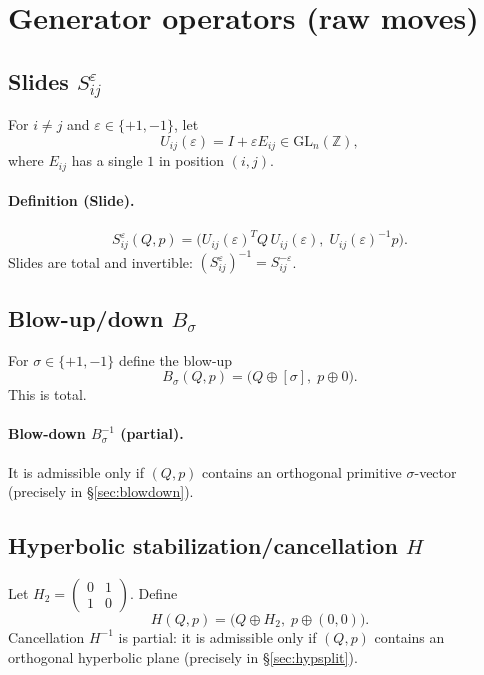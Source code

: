 \documentclass[11pt]{article}
\newcommand{\ZZ}{\mathbb{Z}}
\newcommand{\GL}{\mathrm{GL}}
\begin{document}
\section{Generator operators (raw moves)}

\subsection{Slides \texorpdfstring{$S_{ij}^{\varepsilon}$}{Sij}}
For $i\neq j$ and $\varepsilon\in\{+1,-1\}$, let
\[
U_{ij}(\varepsilon)=I+\varepsilon E_{ij}\in \GL_n(\ZZ),
\]
where $E_{ij}$ has a single $1$ in position $(i,j)$.

\paragraph{Definition (Slide).}
\[
S_{ij}^{\varepsilon}(Q,p)=\big(U_{ij}(\varepsilon)^T Q\, U_{ij}(\varepsilon),\; U_{ij}(\varepsilon)^{-1}p\big).
\]
Slides are total and invertible: $(S_{ij}^{\varepsilon})^{-1}=S_{ij}^{-\varepsilon}$.

\subsection{Blow-up/down \texorpdfstring{$B_\sigma$}{B}}
For $\sigma\in\{+1,-1\}$ define the blow-up
\[
B_\sigma(Q,p)=\big(Q\oplus[\sigma],\; p\oplus 0\big).
\]
This is total.

\paragraph{Blow-down $B_\sigma^{-1}$ (partial).}
It is admissible only if $(Q,p)$ contains an orthogonal primitive $\sigma$-vector (precisely in \S\ref{sec:blowdown}).

\subsection{Hyperbolic stabilization/cancellation \texorpdfstring{$H$}{H}}
Let $H_2=\begin{pmatrix}0&1\\1&0\end{pmatrix}$. Define
\[
H(Q,p)=\big(Q\oplus H_2,\; p\oplus(0,0)\big).
\]
Cancellation $H^{-1}$ is partial: it is admissible only if $(Q,p)$ contains an orthogonal hyperbolic plane (precisely in \S\ref{sec:hypsplit}).

\end{document}
